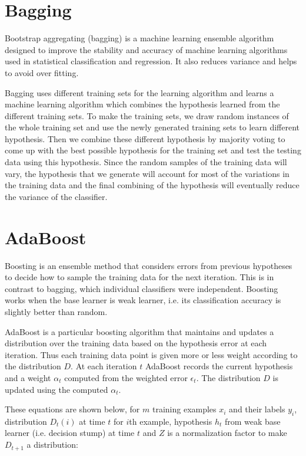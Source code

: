 \documentclass[12pt]{article}
\begin{document}
\section{Bagging}
Bootstrap aggregating (bagging) is a machine learning ensemble algorithm designed to improve the stability and accuracy of machine learning algorithms used in statistical classification and regression. It also reduces variance and helps to avoid over fitting.

Bagging uses different training sets for the learning algorithm and learns a machine learning algorithm which combines the hypothesis learned from the different training sets. To make the training sets, we draw random instances of the whole training set and use the newly generated training sets to learn different hypothesis. Then we combine these different hypothesis by majority voting to come up with the best possible hypothesis for the training set and test the testing data using this hypothesis. Since the random samples of the training data will vary, the hypothesis that we generate will account for most of the variations in the training data and the final combining of the hypothesis will eventually reduce the variance of the classifier.

\section{AdaBoost}
Boosting is an ensemble method that considers errors from previous hypotheses to decide how to sample the training data for the next iteration. This is in contrast to bagging, which individual classifiers were independent. Boosting works when the base learner is weak learner, i.e. its classification accuracy is slightly better than random.

AdaBoost is a particular boosting algorithm that maintains and updates a distribution over the training data based on the hypothesis error at each iteration. Thus each training data point is given more or less weight according to the distribution \(D\). At each iteration \(t\) AdaBoost records the current hypothesis and a weight \(\alpha_t\) computed from the weighted error \(\epsilon_t\). The distribution \(D\) is updated using the computed \(\alpha_t\).

These equations are shown below, for \(m\) training examples \(x_i\) and their labels \(y_i\), distribution \(D_t(i)\) at time \(t\) for \(i\)th example, hypothesis \(h_t\) from weak base learner (i.e. decision stump) at time \(t\) and \(Z\) is a normalization factor to make \(D_{t+1}\) a distribution:
\end{document}
